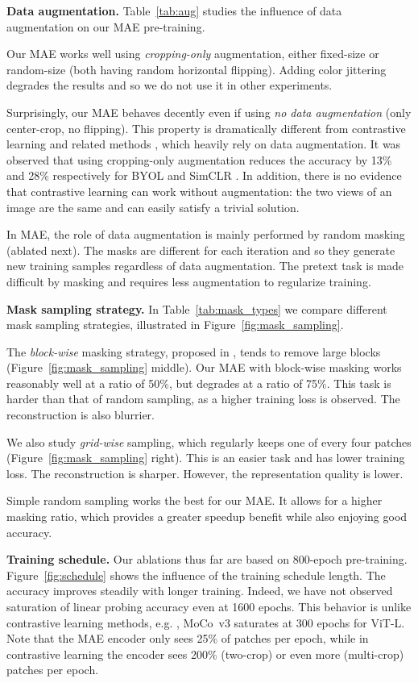 \textbf{Data augmentation.} Table~\ref{tab:aug} studies the influence of data augmentation on our MAE pre-training.

Our MAE works well using \textit{cropping-only} augmentation, either fixed-size or random-size (both having random horizontal flipping). Adding color jittering degrades the results and so we do not use it in other experiments.

Surprisingly, our MAE behaves decently even if using \textit{no data augmentation} (only center-crop, no flipping). This property is dramatically different from contrastive learning and related methods \cite{Wu2018a,He2020,Chen2020,Grill2020}, which heavily rely on data augmentation. It was observed \cite{Grill2020} that using cropping-only augmentation reduces the accuracy by 13\% and 28\% respectively for BYOL \cite{Grill2020} and SimCLR \cite{Chen2020}. In addition, there is no evidence that contrastive learning can work without augmentation: the two views of an image are the same and can easily satisfy a trivial solution.

In MAE, the role of data augmentation is mainly performed by random masking (ablated next). The masks are different for each iteration and so they generate new training samples regardless of data augmentation. The pretext task is made difficult by masking and requires less augmentation to regularize training.

\textbf{Mask sampling strategy.} In Table~\ref{tab:mask_types} we compare different mask sampling strategies, illustrated in Figure~\ref{fig:mask_sampling}.

The \textit{block-wise} masking strategy, proposed in \cite{Bao2021}, tends to remove large blocks (Figure~\ref{fig:mask_sampling} middle). Our MAE with block-wise masking works reasonably well at a ratio of 50\%, but degrades at a ratio of 75\%. This task is harder than that of random sampling, as a higher training loss is observed. The reconstruction is also blurrier.

We also study \textit{grid-wise} sampling, which regularly keeps one of every four patches (Figure~\ref{fig:mask_sampling} right). This is an easier task and has lower training loss. The reconstruction is sharper. However, the representation quality is lower.

Simple random sampling works the best for our MAE. It allows for a higher masking ratio, which provides a greater speedup benefit while also enjoying good accuracy.

\textbf{Training schedule.} Our ablations thus far are based on 800-epoch pre-training. Figure~\ref{fig:schedule} shows the influence of the training schedule length. The accuracy improves steadily with longer training. Indeed, we have not observed saturation of linear probing accuracy even at 1600 epochs. This behavior is unlike contrastive learning methods, e.g. , MoCo~v3 \cite{Chen2021a} saturates at 300 epochs for ViT-L. Note that the MAE encoder only sees 25\% of patches per epoch, while in contrastive learning the encoder sees 200\% (two-crop) or even more (multi-crop) patches per epoch.

